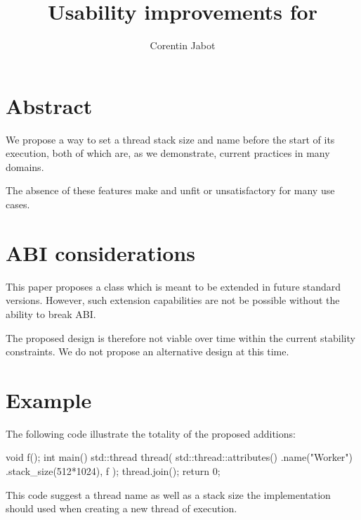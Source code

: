 \documentclass{wg21}
\title{Usability improvements for \tcode{std::thread}}
\author{Corentin Jabot}{corentin.jabot@gmail.com}
\begin{document}
\maketitle

\setlength{\arrayrulewidth}{0.2mm}
\setlength{\tabcolsep}{8pt}
\renewcommand{\arraystretch}{1.}

\def\changemargin#1#2{\list{}{\rightmargin#2\leftmargin#1}\item[]}
\let\endchangemargin=\endlist 
\setlength\extrarowheight{5pt}


\section{Abstract}

We propose a way to set a thread stack size and name before the start of its execution, both of which are,
as we demonstrate, current practices in many domains.

The absence of these features make  and  unfit or unsatisfactory for many use cases.

\section{ABI considerations}

\color{red}

This paper proposes a class  which is meant to be extended in future standard versions.
However, such extension capabilities are not be possible without the ability to break ABI.

The proposed design is therefore not viable over time within the current stability constraints.
We do not propose an alternative design at this time.


\color{black}
\section{Example}

The following code illustrate the totality of the proposed additions:

\begin{colorblock}
void f();
int main() {
    std::thread thread(
     std::thread::attributes()
        .name("Worker")
        .stack_size(512*1024),
     f
    );
    thread.join();
    return 0;
}
\end{colorblock}


This code suggest a thread name as well as a stack size 
the implementation should used when creating a new thread of execution.
\end{document}

